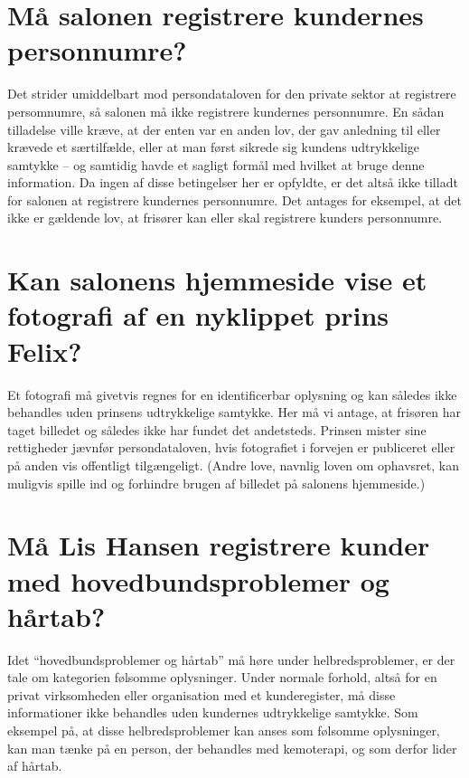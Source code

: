 \documentclass{article}
\author{Mikkel K. Mathiesen, Jannik Gram, Rune \& Rasmus Abrahams{\tt (so|e)}n}
\title{}
\date{\today}
\begin{document}
\maketitle

\section{Må salonen registrere kundernes personnumre?}
Det strider umiddelbart mod persondataloven for den private sektor at registrere persomnumre, så salonen må ikke registrere kundernes personnumre. En sådan tilladelse ville kræve, at der enten var en anden lov, der gav anledning til eller krævede et særtilfælde, eller at man først sikrede sig kundens udtrykkelige samtykke -- og samtidig havde et sagligt formål med hvilket at bruge denne information. Da ingen af disse betingelser her er opfyldte, er det altså ikke tilladt for salonen at registrere kundernes personnumre. Det antages for eksempel, at det ikke er gældende lov, at frisører kan eller skal registrere kunders personnumre.

\section{Kan salonens hjemmeside vise et fotografi af en nyklippet prins Felix?}
Et fotografi må givetvis regnes for en identificerbar oplysning og kan således ikke behandles uden prinsens udtrykkelige samtykke. Her må vi antage, at frisøren har taget billedet og således ikke har fundet det andetsteds. Prinsen mister sine rettigheder jævnfør persondataloven, hvis fotografiet i forvejen er publiceret eller på anden vis offentligt tilgængeligt. (Andre love, navnlig loven om ophavsret, kan muligvis spille ind og forhindre brugen af billedet på salonens hjemmeside.)

\section{Må Lis Hansen registrere kunder med hovedbundsproblemer og hårtab?}
Idet ``hovedbundsproblemer og hårtab'' må høre under helbredsproblemer, er der tale om kategorien følsomme oplysninger. Under normale forhold, altså for en privat virksomheden eller organisation med et kunderegister, må disse informationer ikke behandles uden kundernes udtrykkelige samtykke. Som eksempel på, at disse helbredsproblemer kan anses som følsomme oplysninger, kan man tænke på en person, der behandles med kemoterapi, og som derfor lider af hårtab.
\end{document}
